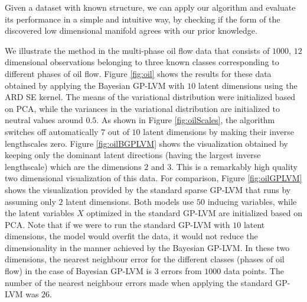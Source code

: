 \documentclass [10pt , a4paper]{article}
\begin{document}
Given a dataset with known structure, we can apply our algorithm and evaluate its performance in a simple and intuitive
way, by checking if the form of the discovered low dimensional manifold agrees with our prior knowledge.
\par
We
illustrate the method in the multi-phase oil
flow data \cite{Bishop:oil93} that consists of $1000$, $12$ 
dimensional observations belonging to three known classes
corresponding to different phases of oil flow.   
Figure \ref{fig:oil} shows the results for these  data obtained
by applying the Bayesian GP-LVM with $10$ latent dimensions using the ARD SE
kernel. The means of the variational distribution were initialized
based on PCA, while the variances in the variational distribution are 
initialized to neutral values around $0.5$. As shown in Figure
\ref{fig:oilScales}, the algorithm switches
off automatically $7$ out of $10$ latent dimensions by making their 
inverse lengthscales zero. Figure \ref{fig:oilBGPLVM} shows the
visualization obtained by keeping only the 
dominant latent directions (having the largest inverse lengthscale)
which are the dimensions $2$ and $3$. This is a remarkably high quality two
dimensional visualization of this data. For comparison, Figure
\ref{fig:oilGPLVM} shows the visualization provided by the standard sparse
GP-LVM that runs by assuming only $2$ latent dimensions. 
Both models use $50$ inducing variables, while the latent variables
$X$ optimized in the standard GP-LVM are initialized based on PCA. 
Note that if we were to run the standard GP-LVM with $10$ latent 
dimensions, the model would overfit the data, it would not reduce the 
dimensionality in the manner achieved by the Bayesian GP-LVM. In these 
two dimensions, the nearest neighbour error for the different classes 
(phases of oil flow) in the case of Bayesian GP-LVM is 3 errors from
$1000$ data points. The number of the nearest neighbour errors made
when applying the standard GP-LVM was $26$. 

%
\end{document}
